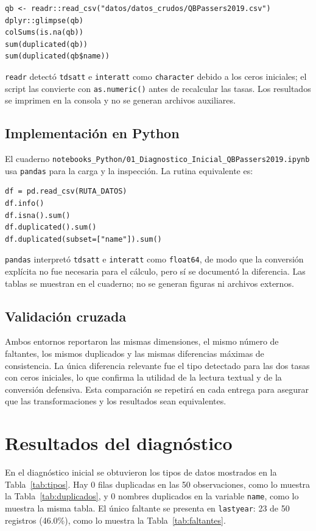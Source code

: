 \documentclass[11pt,a4paper]{article}
\begin{document}
\begin{Verbatim}[fontsize=\small,frame=single,rulecolor=\color{gris},framesep=4mm]
qb <- readr::read_csv("datos/datos_crudos/QBPassers2019.csv")
dplyr::glimpse(qb)
colSums(is.na(qb))
sum(duplicated(qb))
sum(duplicated(qb$name))
\end{Verbatim}

\texttt{readr} detectó \texttt{tdsatt} e \texttt{interatt} como \texttt{character} debido a los ceros iniciales; el script las convierte con \texttt{as.numeric()} antes de recalcular las tasas. Los resultados se imprimen en la consola y no se generan archivos auxiliares.

\subsection*{Implementación en Python}
El cuaderno \texttt{notebooks\_Python/01\_Diagnostico\_Inicial\_QBPassers2019.ipynb} usa \texttt{pandas} para la carga y la inspección. La rutina equivalente es:

\begin{Verbatim}[fontsize=\small,frame=single,rulecolor=\color{gris},framesep=4mm]
df = pd.read_csv(RUTA_DATOS)
df.info()
df.isna().sum()
df.duplicated().sum()
df.duplicated(subset=["name"]).sum()
\end{Verbatim}

\texttt{pandas} interpretó \texttt{tdsatt} e \texttt{interatt} como \texttt{float64}, de modo que la conversión explícita no fue necesaria para el cálculo, pero sí se documentó la diferencia. Las tablas se muestran en el cuaderno; no se generan figuras ni archivos externos.

\subsection*{Validación cruzada}
Ambos entornos reportaron las mismas dimensiones, el mismo número de faltantes, los mismos duplicados y las mismas diferencias máximas de consistencia. La única diferencia relevante fue el tipo detectado para las dos tasas con ceros iniciales, lo que confirma la utilidad de la lectura textual y de la conversión defensiva. Esta comparación se repetirá en cada entrega para asegurar que las transformaciones y los resultados sean equivalentes.

\section{Resultados del diagnóstico}
En el diagnóstico inicial se obtuvieron los tipos de datos mostrados en la Tabla~\ref{tab:tipos}. Hay 0 filas duplicadas en las 50 observaciones, como lo muestra la Tabla~\ref{tab:duplicados}, y 0 nombres duplicados en la variable \texttt{name}, como lo muestra la misma tabla. El único faltante se presenta en \texttt{lastyear}: 23 de 50 registros (46.0\%), como lo muestra la Tabla~\ref{tab:faltantes}.
\end{document}
